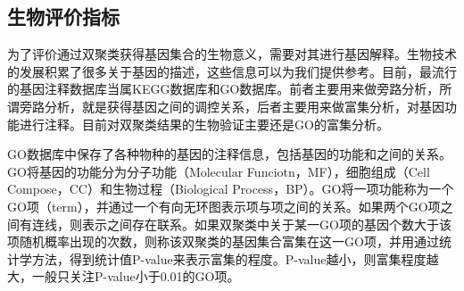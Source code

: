   \subsection{生物评价指标}
  为了评价通过双聚类获得基因集合的生物意义，需要对其进行基因解释。生物技术的发展积累了很多关于基因的描述，这些信息可以为我们提供参考。目前，最流行的基因注释数据库当属KEGG数据库\cite{kegg}和GO数据库\cite{go}。前者主要用来做旁路分析，所谓旁路分析，就是获得基因之间的调控关系，后者主要用来做富集分析，对基因功能进行注释。目前对双聚类结果的生物验证主要还是GO的富集分析。

  GO数据库中保存了各种物种的基因的注释信息，包括基因的功能和之间的关系。GO将基因的功能分为分子功能（Molecular Funciotn，MF），细胞组成（Cell Compose，CC）和生物过程（Biological Process，BP）。GO将一项功能称为一个GO项（term），并通过一个有向无环图表示项与项之间的关系。如果两个GO项之间有连线，则表示之间存在联系。如果双聚类中关于某一GO项的基因个数大于该项随机概率出现的次数，则称该双聚类的基因集合富集在这一GO项，并用通过统计学方法，得到统计值P-value来表示富集的程度。P-value越小，则富集程度越大，一般只关注P-value小于0.01的GO项。  
